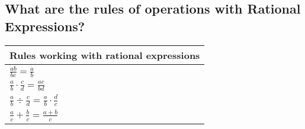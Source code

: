 \subsection{What are the rules of operations with Rational Expressions?}

\begin{small}
    \begin{tabularx}{1\textwidth}{
            p{}
            p{}
        }
        \toprule
        \multicolumn{2}{c}{\textbf{Rules working with rational expressions}} \\
        \midrule

        $ \frac{ab}{bc} = \frac{a}{b} $
        &
        \\
        \midrule

        $ \frac{a}{b} \cdot  \frac{c}{d} = \frac{ac}{bd} $
        &
        \\
        \midrule

        $ \frac{a}{b} \div  \frac{c}{d} = \frac{a}{b} \cdot  \frac{d}{c} $
        &
        \\
        \midrule

        $ \frac{a}{c} +  \frac{b}{c} = \frac{a + b}{c} $
        &
        \\
        \bottomrule
    \end{tabularx}

\end{small}
